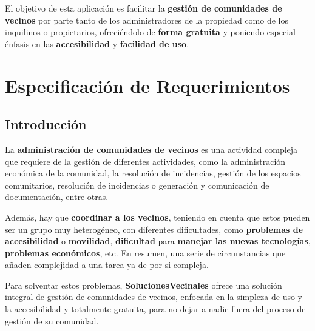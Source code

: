 El objetivo de esta aplicación es facilitar la \textbf{gestión de comunidades de vecinos} por parte tanto de los administradores de la propiedad como de los inquilinos o propietarios, ofreciéndolo de \textbf{forma gratuita} y poniendo especial énfasis en las \textbf{accesibilidad} y \textbf{facilidad de uso}.

\section{Especificación de Requerimientos}

\subsection{Introducción}
La \textbf{administración de comunidades de vecinos} es una actividad compleja que requiere de la gestión de diferentes actividades, como la administración económica de la comunidad, la resolución de incidencias, gestión de los espacios comunitarios, resolución de incidencias o generación y comunicación de documentación, entre otras. 

Además, hay que \textbf{coordinar a los vecinos}, teniendo en cuenta que estos pueden ser un grupo muy heterogéneo, con diferentes dificultades, como \textbf{problemas de accesibilidad} o \textbf{movilidad}, \textbf{dificultad} para \textbf{manejar las nuevas tecnologías}, \textbf{problemas económicos}, etc. En resumen, una serie de circunstancias que añaden complejidad a una tarea ya de por si compleja.

Para solventar estos problemas, \textbf{SolucionesVecinales} ofrece una solución integral de gestión de comunidades de vecinos, enfocada en la simpleza de uso y la accesibilidad y totalmente gratuita, para no dejar a nadie fuera del proceso de gestión de su comunidad.





%

